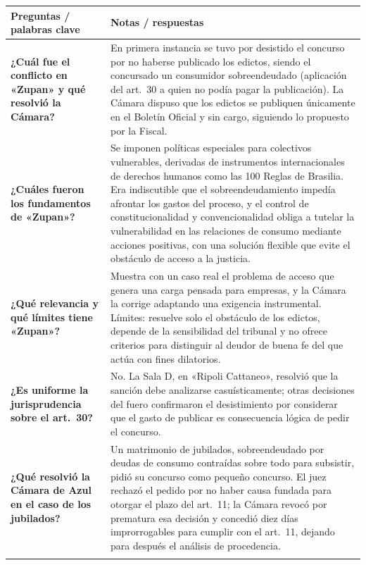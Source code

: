 \documentclass[12pt,oneside]{book}
\makeatletter
\newenvironment{cornell}{%
  \renewcommand{\arraystretch}{1.2}%
  \begin{longtable}{@{}>{\raggedright\arraybackslash}p{0.27\textwidth}|>{\raggedright\arraybackslash}p{0.65\textwidth}@{}}
  \toprule
  \textbf{Preguntas / palabras clave} & \textbf{Notas / respuestas} \\
  \midrule
  \endhead
}{%
  \bottomrule
  \end{longtable}%
}
\makeatother
\begin{document}
\begin{cornell}
\textbf{¿Cuál fue el conflicto en «Zupan» y qué resolvió la Cámara?} &
En primera instancia se tuvo por desistido el concurso por no haberse publicado los edictos, siendo el concursado un consumidor sobreendeudado (aplicación del art.~30 a quien no podía pagar la publicación). La Cámara dispuso que los edictos se publiquen únicamente en el Boletín Oficial y sin cargo, siguiendo lo propuesto por la Fiscal. \\
\addlinespace

\textbf{¿Cuáles fueron los fundamentos de «Zupan»?} &
Se imponen políticas especiales para colectivos vulnerables, derivadas de instrumentos internacionales de derechos humanos como las 100 Reglas de Brasilia. Era indiscutible que el sobreendeudamiento impedía afrontar los gastos del proceso, y el control de constitucionalidad y convencionalidad obliga a tutelar la vulnerabilidad en las relaciones de consumo mediante acciones positivas, con una solución flexible que evite el obstáculo de acceso a la justicia. \\
\addlinespace

\textbf{¿Qué relevancia y qué límites tiene «Zupan»?} &
Muestra con un caso real el problema de acceso que genera una carga pensada para empresas, y la Cámara la corrige adaptando una exigencia instrumental. Límites: resuelve solo el obstáculo de los edictos, depende de la sensibilidad del tribunal y no ofrece criterios para distinguir al deudor de buena fe del que actúa con fines dilatorios. \\
\addlinespace

\textbf{¿Es uniforme la jurisprudencia sobre el art.~30?} &
No. La Sala D, en «Ripoli Cattaneo», resolvió que la sanción debe analizarse casuísticamente; otras decisiones del fuero confirmaron el desistimiento por considerar que el gasto de publicar es consecuencia lógica de pedir el concurso. \\
\addlinespace

\textbf{¿Qué resolvió la Cámara de Azul en el caso de los jubilados?} &
Un matrimonio de jubilados, sobreendeudado por deudas de consumo contraídas sobre todo para subsistir, pidió su concurso como pequeño concurso. El juez rechazó el pedido por no haber causa fundada para otorgar el plazo del art.~11; la Cámara revocó por prematura esa decisión y concedió diez días improrrogables para cumplir con el art.~11, dejando para después el análisis de procedencia. \\
\addlinespace


\end{cornell}
\end{document}
